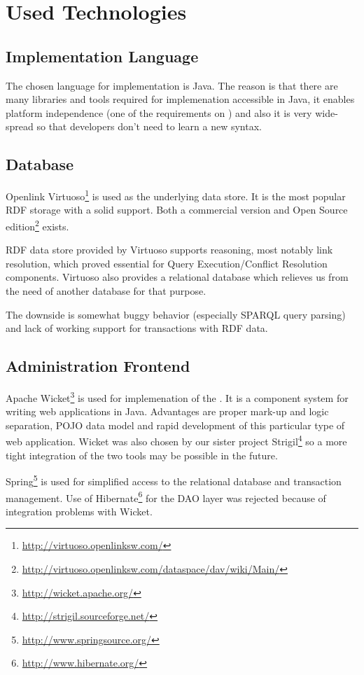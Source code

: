 \section{Used Technologies}

\subsection{Implementation Language}
The chosen language for implementation is Java. The reason is that there are many libraries and tools required for implemenation accessible in Java, it enables platform independence (one of the requirements on \odcs) and also it is very wide-spread so that developers don't need to learn a new syntax.

\subsection{Database}
Openlink Virtuoso\footnote{\url{http://virtuoso.openlinksw.com/}} is used as the underlying data store. It is the most popular RDF storage with a solid support. Both a commercial version and Open Source edition\footnote{\url{http://virtuoso.openlinksw.com/dataspace/dav/wiki/Main/}} exists.

RDF data store provided by Virtuoso supports reasoning, most notably  link resolution, which proved essential for Query Execution/Conflict Resolution components. Virtuoso also provides a relational database which relieves us from the need of another database for that purpose.

The downside is somewhat buggy behavior (especially SPARQL query parsing) and lack of working support for transactions with RDF data.

\subsection{Administration Frontend}
Apache Wicket\footnote{\url{http://wicket.apache.org/}} is used for implemenation of the \FE. It is a component system for writing web applications in Java. Advantages are proper mark-up and logic separation, POJO data model and rapid development of this particular type of web application. Wicket was also chosen by our sister project Strigil\footnote{\url{http://strigil.sourceforge.net/}} so a more tight integration of the two tools may be possible in the future.

Spring\footnote{\url{http://www.springsource.org/}} is used for simplified access to the relational database and transaction management. Use of Hibernate\footnote{\url{http://www.hibernate.org/}} for the DAO layer was rejected because of integration problems with Wicket.

